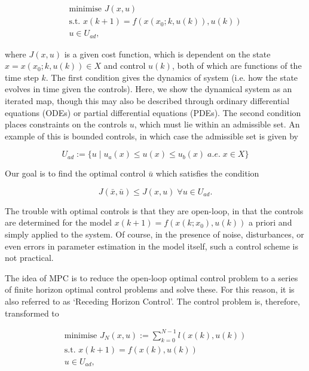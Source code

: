 \documentclass[.../main.tex]{subfiles}
\begin{document}
\begin{equation}
    \begin{split}
        \text{minimise } J(x, u) \\
        \text{s.t. }
        x(k + 1) = f(x(x_0; k, u(k)), u(k))\\
        u \in U_{ad},
    \end{split}
\end{equation}

where $J(x, u)$ is a given cost function, which is dependent on the state $x = x(x_0; k, u(k)) \in
X$ and control
$u(k)$, both of which are functions of the time step $k$. The first condition gives the dynamics of
system (i.e. how the state evolves in time given the controls). Here, we show the dynamical
system as an iterated map, though this may also be described through ordinary differential equations
(ODEs) or partial differential equations (PDEs). The second condition places constraints on the
controls $u$, which must lie within an admissible set. An example of this is bounded controls, in
which case the admissible set is given by

\begin{equation}
    U_{ad} := \{u \; | \; u_a(x) \leq u(x) \leq u_b(x) \; a.e. \; x \in X\}
\end{equation}

Our goal is to find the optimal control $\bar{u}$ which satisfies the condition

\begin{equation}
    J(\bar{x}, \bar{u}) \leq J(x, u) \; \forall u \in U_{ad}.
\end{equation}

The trouble with optimal controls is that they are open-loop, in that the controls are determined
for the model $x(k + 1) = f(x(k; x_0), u(k))$ a priori and simply applied to the system. Of course,
in the presence of noise, disturbances, or even errors in parameter estimation in the model itself,
such a control scheme is not practical. 

The idea of MPC is to reduce the open-loop optimal control problem to a series of finite horizon
optimal control problems and solve these. For this reason, it is also referred to as `Receding
Horizon Control'. The control problem is, therefore, transformed to

\begin{equation}
    \begin{split}
        \text{minimise } J_N(x, u) := \sum_{k = 0}^{N-1} l(x(k), u(k)) \\
        \text{s.t. }
        x(k + 1) = f(x(k), u(k))\\
        u \in U_{ad},
    \end{split}
\end{equation}
\end{document}
